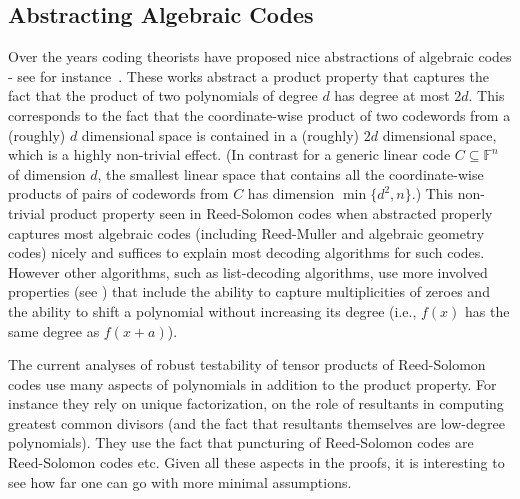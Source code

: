 \documentclass[11pt]{article}
\newcommand{\F}{\mathbb{F}}
\newcommand{\mnote}[1]{{\color{teal} [Madhu: #1]}}
\newcommand{\mnote}[1]{}
\begin{document}
\subsection{Abstracting Algebraic Codes} 

Over the years coding theorists have proposed nice abstractions of algebraic codes - see for instance~\cite{DuuKot,Pellikaan}. These works abstract a product property that captures the fact that the product of two polynomials of degree $d$ has degree at most $2d$. 
This corresponds to the fact that the coordinate-wise product of two codewords from a (roughly) $d$ dimensional space is contained in a (roughly) $2d$ dimensional space, which is a highly non-trivial effect. (In contrast for a generic linear code $C \subseteq \F^n$ of dimension $d$, the smallest linear space that contains all the coordinate-wise products of pairs of codewords from $C$ has dimension $\min\{d^2,n\}$.) This non-trivial product property seen in Reed-Solomon codes when abstracted properly captures most algebraic codes (including Reed-Muller and algebraic geometry codes) nicely and suffices to explain most decoding algorithms for such codes. However other algorithms, such as list-decoding algorithms, use more involved properties (see \cite{GuSu-ag}) that include the ability to capture multiplicities of zeroes and the ability to shift a polynomial without increasing its degree (i.e., $f(x)$ has the same degree as $f(x+a)$). 

The current analyses of robust testability of tensor products of Reed-Solomon codes use many aspects of polynomials in addition to the product property. For instance they rely on unique factorization, on the role of resultants in computing greatest common divisors (and the fact that resultants themselves are low-degree polynomials). They use the fact that puncturing of Reed-Solomon codes are Reed-Solomon codes etc. Given all these aspects in the proofs, it is interesting to see how far one can go with more minimal assumptions. 
\end{document}
